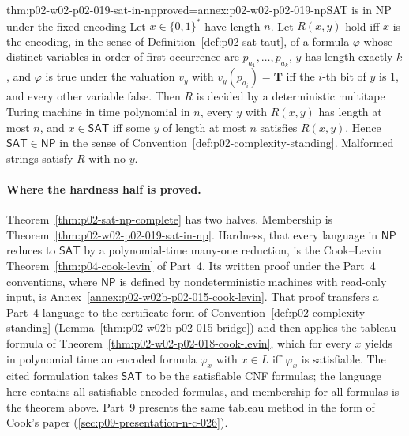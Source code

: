 \begin{hbtheorem}{thm:p02-w02-p02-019-sat-in-np}{proved=annex:p02-w02-p02-019-np}{SAT is in NP under the fixed encoding}
Let \(x\in\{0,1\}^*\) have length \(n\).  Let \(R(x,y)\) hold iff \(x\) is the
encoding, in the sense of Definition~\ref{def:p02-sat-taut}, of a formula
\(\varphi\) whose distinct variables in order of first occurrence are
\(p_{a_1},\ldots,p_{a_k}\), \(y\) has length exactly \(k\), and \(\varphi\) is
true under the valuation \(v_y\) with \(v_y(p_{a_i})=\mathbf{T}\) iff the \(i\)-th
bit of \(y\) is \(1\), and every other variable false.  Then \(R\) is decided
by a deterministic multitape Turing machine in time polynomial in \(n\), every
\(y\) with \(R(x,y)\) has length at most \(n\), and \(x\in\mathsf{SAT}\) iff some
\(y\) of length at most \(n\) satisfies \(R(x,y)\).  Hence
\(\mathsf{SAT}\in\mathsf{NP}\) in the sense of
Convention~\ref{def:p02-complexity-standing}.  Malformed strings satisfy
\(R\) with no \(y\).
\end{hbtheorem}

\paragraph{Where the hardness half is proved.}
Theorem~\ref{thm:p02-sat-np-complete} has two halves.  Membership is
Theorem~\ref{thm:p02-w02-p02-019-sat-in-np}.  Hardness, that every language in
\(\mathsf{NP}\) reduces to \(\mathsf{SAT}\) by a polynomial-time many-one
reduction, is the Cook--Levin Theorem~\ref{thm:p04-cook-levin} of Part~4.
Its written proof under the Part~4 conventions, where \(\mathsf{NP}\) is
defined by nondeterministic machines with read-only input, is
Annex~\ref{annex:p02-w02b-p02-015-cook-levin}.  That proof transfers a
Part~4 language to the certificate form of
Convention~\ref{def:p02-complexity-standing}
(Lemma~\ref{thm:p02-w02b-p02-015-bridge}) and then applies the tableau
formula of Theorem~\ref{thm:p02-w02-p02-018-cook-levin}, which for every
\(x\) yields in polynomial time an encoded formula \(\varphi_x\) with
\(x\in L\) iff \(\varphi_x\) is satisfiable.  The cited formulation
\cite[thm.~2.10]{AroraBarak2009} takes \(\mathsf{SAT}\) to be the
satisfiable CNF formulas; the language here contains all satisfiable encoded
formulas, and membership for all formulas is the theorem above.  Part~9
presents the same tableau method in the form of Cook's paper
(\cref{sec:p09-presentation-n-c-026}).

